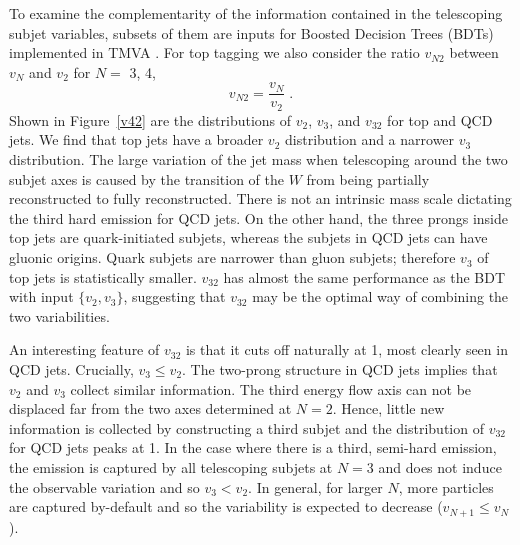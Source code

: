 \documentclass[aps,prl,floatfix,preprintnumbers,twocolumn,groupedaddress,nofootinbib]{revtex4-1}
\newcommand{\be}{\begin{equation}}
\newcommand{\ee}{\end{equation}}
\begin{document}
To examine the complementarity of the information contained in the telescoping subjet variables, subsets of them are inputs for Boosted Decision Trees (BDTs) implemented in \textsc{TMVA} \cite{Hocker:2007ht}. For top tagging we also consider the ratio $v_{N2}$ between $v_N$ and $v_2$ for $N = $ 3, 4,
\be
    v_{N2}=\frac{v_N}{v_2}\;.
\ee
Shown in Figure~\ref{v42} are the distributions of $v_2$, $v_3$, and $v_{32}$ for top and QCD jets. We find that top jets have a broader $v_2$ distribution and a narrower $v_3$ distribution. The large variation of the jet mass when telescoping around the two subjet axes is caused by the transition of the $W$ from being partially reconstructed to fully reconstructed. There is not an intrinsic mass scale dictating the third hard emission for QCD jets. On the other hand, the three prongs inside top jets are quark-initiated subjets, whereas the subjets in QCD jets can have gluonic origins. Quark subjets are narrower than gluon subjets; therefore $v_3$ of top jets is statistically smaller. $v_{32}$ has almost the same performance as the BDT with input $\{v_2,v_3\}$, suggesting that $v_{32}$ may be the optimal way of combining the two variabilities.

An interesting feature of $v_{32}$ is that it cuts off naturally at 1, most clearly seen in QCD jets. Crucially, $v_{3} \leq v_{2}$. The two-prong structure in QCD jets implies that $v_{2}$ and $v_{3}$ collect similar information. The third energy flow axis can not be displaced far from the two axes determined at $N=2$. Hence, little new information is collected by constructing a third subjet and the distribution of $v_{32}$ for QCD jets peaks at 1. In the case where there is a third, semi-hard emission, the emission is captured by all telescoping subjets at $N=3$ and does not induce the observable variation and so $v_{3} < v_{2}$. In general, for larger $N$, more particles are captured by-default and so the variability is expected to decrease ($v_{N+1}\leq v_{N}$).
\end{document}
